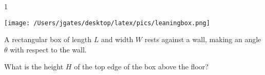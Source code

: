 
\AddToShipoutPicture*{\BackgroundPic}

\addtocounter {ProbNum} {1}

\begin{floatingfigure}[r]{.3\textwidth}
\texttt{[image: /Users/jgates/desktop/latex/pics/leaningbox.png]}
\end{floatingfigure}
 
{\bf \Large{}} A rectangular box of length $L$ and width $W$ rests against a wall, making an angle $\theta$ with respect to the wall.  

\bigskip

\indent What is the height $H$ of the top edge of the box above the floor?

\vfill

\newpage
